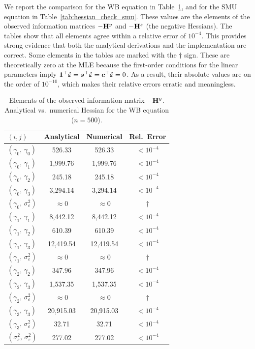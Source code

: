 We report the comparison for the WB equation in Table~\ref{tab:hessian_check_wb}, and for the SMU equation in Table~\ref{tab:hessian_check_smu}. These values are the elements of the observed information matrices $-\mathbf{H}^y$ and $-\mathbf{H}^s$ (the negative Hessians). The tables show that all elements agree within a relative error of $10^{-4}$. This provides strong evidence that both the analytical derivations and the implementation are correct. Some elements in the tables are marked with the $\dagger$ sign. These are theoretically zero at the MLE because the first-order conditions for the linear parameters imply $\bm{1}^\top\hat{\bm{\varepsilon}} = \bm{s}^\top\hat{\bm{\varepsilon}} = \bm{c}^\top\hat{\bm{\varepsilon}} = 0$. As a result, their absolute values are on the order of $10^{-10}$, which makes their relative errors erratic and meaningless.

\begin{table}[htbp]
\centering
\caption[Analytical vs.\ numerical Hessian for the WB equation]{Elements of the observed information matrix $-\mathbf{H}^y$. Analytical vs.\ numerical Hessian for the WB equation ($n = 500$).}
\label{tab:hessian_check_wb}
\begin{tabular}{lccc}
\toprule
$(i,j)$ & Analytical & Numerical & Rel.\ Error \\
\midrule
$(\gamma_0,\, \gamma_0)$ & 526.33 & 526.33 & $< 10^{-4}$ \\
$(\gamma_0,\, \gamma_1)$ & 1{,}999.76 & 1{,}999.76 & $< 10^{-4}$ \\
$(\gamma_0,\, \gamma_2)$ & 245.18 & 245.18 & $< 10^{-4}$ \\
$(\gamma_0,\, \gamma_3)$ & 3{,}294.14 & 3{,}294.14 & $< 10^{-4}$ \\
$(\gamma_0,\, \sigma_\varepsilon^2)$ & $\approx 0$ & $\approx 0$ & $\dagger$ \\
$(\gamma_1,\, \gamma_1)$ & 8{,}442.12 & 8{,}442.12 & $< 10^{-4}$ \\
$(\gamma_1,\, \gamma_2)$ & 610.39 & 610.39 & $< 10^{-4}$ \\
$(\gamma_1,\, \gamma_3)$ & 12{,}419.54 & 12{,}419.54 & $< 10^{-4}$ \\
$(\gamma_1,\, \sigma_\varepsilon^2)$ & $\approx 0$ & $\approx 0$ & $\dagger$ \\
$(\gamma_2,\, \gamma_2)$ & 347.96 & 347.96 & $< 10^{-4}$ \\
$(\gamma_2,\, \gamma_3)$ & 1{,}537.35 & 1{,}537.35 & $< 10^{-4}$ \\
$(\gamma_2,\, \sigma_\varepsilon^2)$ & $\approx 0$ & $\approx 0$ & $\dagger$ \\
$(\gamma_3,\, \gamma_3)$ & 20{,}915.03 & 20{,}915.03 & $< 10^{-4}$ \\
$(\gamma_3,\, \sigma_\varepsilon^2)$ & 32.71 & 32.71 & $< 10^{-4}$ \\
$(\sigma_\varepsilon^2,\, \sigma_\varepsilon^2)$ & 277.02 & 277.02 & $< 10^{-4}$ \\
\bottomrule
\end{tabular}
\end{table}

